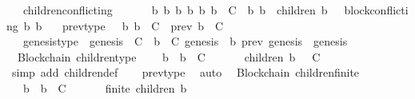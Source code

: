 \begin{isabellebody}
\ \ \ children{\isacharunderscore}conflicting\ {\isacharcolon}\ {\isachardoublequoteopen}{\isasymforall}\ {\isasymsigma}\ {\isasymin}\ {\isasymSigma}{\isachardot}\ {\isasymforall}\ b\ b{}\ b{}{\isachardot}\ {\isacharbraceleft}b{\isacharcomma}\ b{}{\isacharcomma}\ b{}{\isacharbraceright}\ {\isasymsubseteq}\ C\ {\isasymand}\ {\isacharbraceleft}b{}{\isacharcomma}\ b{}{\isacharbraceright}\ {\isasymsubseteq}\ children\ {\isacharparenleft}b{\isacharcomma}\ {\isasymsigma}{\isacharparenright}\ {\isasymlongrightarrow}\ block{\isacharunderscore}conflicting\ {\isacharparenleft}b{}{\isacharcomma}\ b{}{\isacharparenright}{\isachardoublequoteclose}\isanewline
\ \ \ prev{\isacharunderscore}type\ {\isacharcolon}\ {\isachardoublequoteopen}{\isasymforall}\ b{\isachardot}\ b\ {\isasymin}\ C\ {\isasymlongleftrightarrow}\ prev\ b\ {\isasymin}\ C{\isachardoublequoteclose}\isanewline
\ \ \ genesis{\isacharunderscore}type\ {\isacharcolon}\ {\isachardoublequoteopen}genesis\ {\isasymin}\ C{\isachardoublequoteclose}\ {\isachardoublequoteopen}{\isasymforall}\ b\ {\isasymin}\ C{\isachardot}\ genesis\ {\isasymdownharpoonright}\ b{\isachardoublequoteclose}\ {\isachardoublequoteopen}prev\ genesis\ {\isacharequal}\ genesis{\isachardoublequoteclose}\isanewline
\isanewline
{}\isamarkupfalse%
\ {\isacharparenleft}\ Blockchain{\isacharparenright}\ children{\isacharunderscore}type\ {\isacharcolon}\isanewline
\ \ {\isachardoublequoteopen}{\isasymforall}\ b\ {\isasymsigma}{\isachardot}\ b\ {\isasymin}\ C\ {\isasymand}\ {\isasymsigma}\ {\isasymin}\ {\isasymSigma}\ {\isasymlongrightarrow}\ \ children\ {\isacharparenleft}b{\isacharcomma}\ {\isasymsigma}{\isacharparenright}\ {\isasymsubseteq}\ C{\isachardoublequoteclose}\isanewline
%
\isadelimproof
\ \ %
\endisadelimproof
%
\isatagproof
{}\isamarkupfalse%
\ {\isacharparenleft}simp\ add{\isacharcolon}\ children{\isacharunderscore}def{\isacharparenright}\isanewline
\ \ \isamarkupfalse%
\ prev{\isacharunderscore}type\ \isamarkupfalse%
\ auto%
\endisatagproof
{\isafoldproof}%
%
\isadelimproof
\isanewline
%
\endisadelimproof
\isanewline
{}\isamarkupfalse%
\ {\isacharparenleft}\ Blockchain{\isacharparenright}\ children{\isacharunderscore}finite\ {\isacharcolon}\isanewline
\ \ {\isachardoublequoteopen}{\isasymforall}\ b\ {\isasymsigma}{\isachardot}\ b\ {\isasymin}\ C\ {\isasymand}\ {\isasymsigma}\ {\isasymin}\ {\isasymSigma}\ {\isasymlongrightarrow}\ \ finite\ {\isacharparenleft}children\ {\isacharparenleft}b{\isacharcomma}\ {\isasymsigma}{\isacharparenright}{\isacharparenright}{\isachardoublequoteclose}\isanewline

\end{isabellebody}
